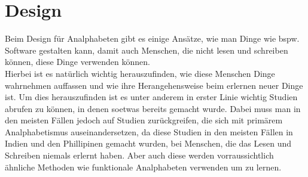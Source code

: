 \section{Design}

Beim Design für Analphabeten gibt es einige Ansätze, wie man Dinge wie bspw. Software gestalten kann, damit auch Menschen, die nicht lesen und schreiben können, diese Dinge verwenden können.\\
Hierbei ist es natürlich wichtig herauszufinden, wie diese Menschen Dinge wahrnehmen auffassen und wie ihre Herangehensweise beim erlernen neuer Dinge ist. Um dies herauszufinden ist es unter anderem in erster Linie wichtig Studien abrufen zu können, in denen soetwas bereits gemacht wurde. Dabei muss man in den meisten Fällen jedoch auf Studien zurückgreifen, die sich mit primärem Analphabetismus auseinandersetzen, da diese Studien in den meisten Fällen in Indien und den Phillipinen gemacht wurden, bei Menschen, die das Lesen und Schreiben niemals erlernt haben. Aber auch diese werden vorraussichtlich ähnliche Methoden wie funktionale Analphabeten verwenden um zu lernen.\\
